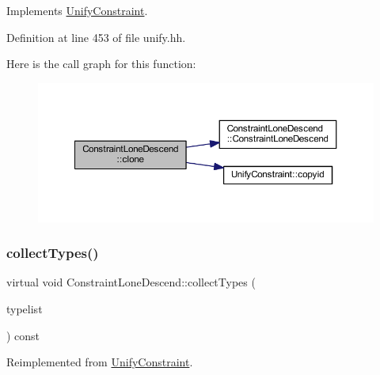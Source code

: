 Implements \mbox{\hyperlink{class_unify_constraint_a4f068343932637d355644bb21559aa12}{Unify\+Constraint}}.



Definition at line 453 of file unify.\+hh.

Here is the call graph for this function\+:
\nopagebreak
\begin{figure}[H]
\begin{center}
\leavevmode
\includegraphics[width=350pt]{class_constraint_lone_descend_a8dea8363968160213540242b07aaf972_cgraph}
\end{center}
\end{figure}
\mbox{\label{class_constraint_lone_descend_a4ef34bbfea218b6d879766a2d206a811}} 
\subsubsection{\texorpdfstring{collectTypes()}{collectTypes()}}
{\footnotesize\ttfamily virtual void Constraint\+Lone\+Descend\+::collect\+Types (\begin{DoxyParamCaption}\item[{vector$<$ \mbox{\hyperlink{class_unify_datatype}{Unify\+Datatype}} $>$ \&}]{typelist }\end{DoxyParamCaption}) const\hspace{0.3cm}{\ttfamily [virtual]}}



Reimplemented from \mbox{\hyperlink{class_unify_constraint_acb83b6bea3b21e13054e72ac9cfaba0f}{Unify\+Constraint}}.

\mbox{\label{class_constraint_lone_descend_a006603f95347698cc1d8719d642cdcc0}} 
